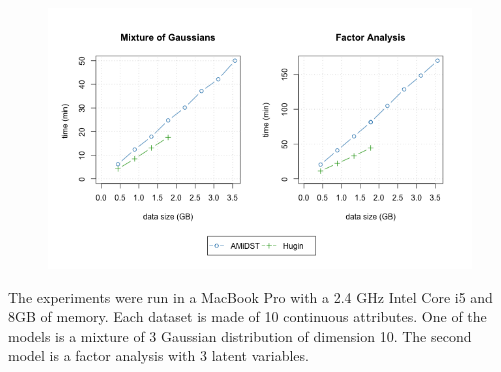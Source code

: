 \documentclass[10pt,a4paper]{article}
\begin{document}
\begin{figure}[h!]
	\centering
	\includegraphics[width=15cm]{img/amidsthugin.png}
\end{figure}


The experiments were run in a MacBook Pro with a 2.4 GHz Intel Core i5 and 8GB of memory. Each dataset is made of 10 continuous attributes. One of the models is a mixture of 3 Gaussian distribution of dimension 10. The second model is a factor analysis with 3 latent variables. 
\end{document}
